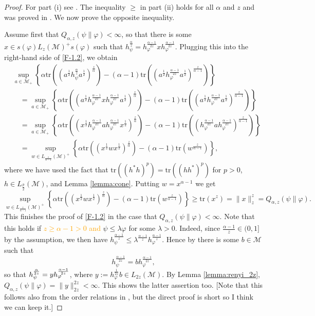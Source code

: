 \documentclass[12pt]{article}
\theoremstyle{definition}
\theoremstyle{remark}
\numberwithin{equation}{section}
\def\Me{\mathcal M}
\def\Tr{\mathrm{tr}}
\def\ffi{\varphi}
\begin{document}
\begin{proof} For part (i) see \cite[Theorem 1(vi)]{kato2023onrenyi}. The inequality $\ge$ in part (ii)
holds for all $\alpha$ and $z$ and was proved in \cite[Theorem 2(vi)]{kato2023onrenyi}. We now prove
the opposite inequality. 

Assume first that $Q_{\alpha,z}(\psi\|\varphi)<\infty$, so that there is some $x\in
s(\varphi)L_z(\Me)^+s(\varphi)$ such that
$h_\psi^{\frac{\alpha}{z}}=h_\varphi^{\frac{\alpha-1}{2z}}xh_\varphi^{\frac{\alpha-1}{2z}}$. Plugging this
into the right-hand side of \eqref{F-1.2}, we obtain
\begin{align}
&\sup_{a\in \Me_+} \left\{\alpha
\Tr\left((a^{\frac12}h_\psi^{\frac{\alpha}{z}}a^{\frac12})^{\frac{z}{\alpha}}\right)-(\alpha-1)
\Tr\left((a^{\frac12}h_\varphi^{\frac{\alpha-1}{2z}}a^{\frac12})^{\frac{z}{\alpha-1}}\right) \right\}
\nonumber\\
&\quad=\sup_{a\in \Me_+} \left\{\alpha
\Tr\left((a^{\frac12}h_\varphi^{\frac{\alpha-1}{2z}}xh_\varphi^{\frac{\alpha-1}{2z}}
a^{\frac12})^{\frac{z}{\alpha}}\right)-(\alpha-1)
\Tr\left((a^{\frac12}h_\varphi^{\frac{\alpha-1}{2z}}a^{\frac12})^{\frac{z}{\alpha-1}}\right) \right\}
\nonumber\\
&\quad=\sup_{a\in \Me_+} \left\{\alpha
\Tr\left((x^{\frac12}h_\varphi^{\frac{\alpha-1}{2z}}ah_\varphi^{\frac{\alpha-1}{2z}}
x^{\frac12})^{\frac{z}{\alpha}}\right)-(\alpha-1)
\Tr\left((h_\varphi^{\frac{\alpha-1}{2z}}a h_\varphi^{\frac{\alpha-1}{2z}}
)^{\frac{z}{\alpha-1}}\right)\right\}\nonumber\\
&\quad=\sup_{w\in L_{\frac{z}{\alpha-1}}(\Me)^+} \left\{\alpha
\Tr\left((x^{\frac12}wx^{\frac12})^{\frac{z}{\alpha}}\right)-(\alpha-1)
\Tr\left(w^{\frac{z}{\alpha-1}}\right)
\right\}, \label{F-1.3}
\end{align}
where we have used the fact that $\Tr\left((h^*h)^p\right)=\Tr\left((hh^*)^p\right)$ for
$p>0$, $h\in L_{\frac{p}{2}}(\Me)$, and Lemma \ref{lemma:cone}.
 Putting $w=x^{\alpha-1}$ we
get
\[
\sup_{w\in L_{\frac{z}{\alpha-1}}(\Me)^+} \left\{\alpha
\Tr\left((x^{\frac12}wx^{\frac12})^{\frac{z}{\alpha}}\right)-(\alpha-1)
\Tr\left(w^{\frac{z}{\alpha-1}}\right)
\right\}\ge \Tr(x^z)=\|x\|_z^z= Q_{\alpha,z}(\psi\|\varphi).
\]
This finishes the proof of \eqref{F-1.2} in the case that $Q_{\alpha,z}(\psi\|\varphi)<\infty$. Note that
this holds if \textcolor{orange}{$z\ge \alpha-1>0$ and} $\psi\le \lambda\varphi$ for some $\lambda>0$. {Indeed, since
$\frac{\alpha-1}{z}\in (0,1]$ by the assumption, we then have 
$h_\psi^{\frac{\alpha-1}{z}}\le \lambda^{\frac{\alpha-1}{z}}h_\varphi^{\frac{\alpha-1}{z}}$.
Hence by \cite[Lemma A.58]{hiai2021quantum} there is some $b\in \Me$ such that 
\[
h_\psi^{\frac{\alpha-1}{2z}}=bh_\varphi^{\frac{\alpha-1}{2z}},
\]
so that $h_\psi^{\alpha\over2z}=yh_\ffi^{\alpha-1\over2z}$, where
$y:=h_\varphi^{\frac{1}{2z}}b\in L_{2z}(\Me)$. By Lemma \ref{lemma:renyi_2z},
$Q_{\alpha,z}(\psi\|\varphi)=\|y\|_{2z}^{2z}<\infty$. This shows the latter assertion too.}
{\color{orange}[Note that this follows also from the order relations in \cite[Theorem 2(iii)]{kato2023onrenyi},
but the direct proof is short so I think we can keep it.]}


\end{proof}
\end{document}
